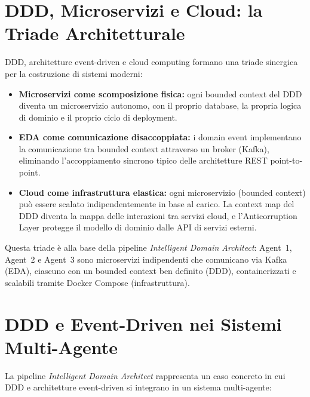 \documentclass[12pt,a4paper]{report}
\begin{document}
\section{DDD, Microservizi e Cloud: la Triade Architetturale}

DDD, architetture event-driven e cloud computing formano una triade
sinergica per la costruzione di sistemi moderni:

\begin{itemize}
  \item \textbf{Microservizi come scomposizione fisica:} ogni bounded context
        del DDD diventa un microservizio autonomo, con il proprio database,
        la propria logica di dominio e il proprio ciclo di deployment.

  \item \textbf{EDA come comunicazione disaccoppiata:} i domain event
        implementano la comunicazione tra bounded context attraverso un
        broker (Kafka), eliminando l'accoppiamento sincrono tipico delle
        architetture REST point-to-point.

  \item \textbf{Cloud come infrastruttura elastica:} ogni microservizio
        (bounded context) può essere scalato indipendentemente in base al
        carico. La context map del DDD diventa la mappa delle interazioni
        tra servizi cloud, e l'Anticorruption Layer protegge il modello di
        dominio dalle API di servizi esterni.
\end{itemize}

Questa triade è alla base della pipeline \textit{Intelligent Domain Architect}:
Agent~1, Agent~2 e Agent~3 sono microservizi indipendenti che comunicano via
Kafka (EDA), ciascuno con un bounded context ben definito (DDD), containerizzati
e scalabili tramite Docker Compose (infrastruttura).

\section{DDD e Event-Driven nei Sistemi Multi-Agente}

La pipeline \textit{Intelligent Domain Architect} rappresenta un caso concreto in
cui DDD e architetture event-driven si integrano in un sistema multi-agente:
\end{document}
